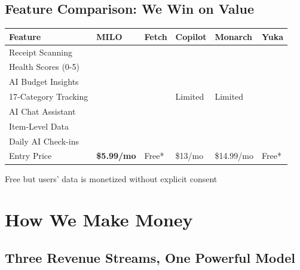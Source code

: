 \documentclass[11pt,a4paper]{report}
\newcommand{\cmark}{\textcolor{successgreen}{\ding{51}}}
\newcommand{\xmark}{\textcolor{dangerred}{\ding{55}}}
\begin{document}
\section{Feature Comparison: We Win on Value}

\begin{center}
\renewcommand{\arraystretch}{1.4}
\begin{tabular}{>{\raggedright\arraybackslash}p{3cm} >{\centering\arraybackslash}p{1.8cm} >{\centering\arraybackslash}p{1.8cm} >{\centering\arraybackslash}p{1.8cm} >{\centering\arraybackslash}p{1.8cm} >{\centering\arraybackslash}p{1.8cm}}
\toprule
\rowcolor{miloprimary!15}
\textbf{Feature} & \textbf{MILO} & \textbf{Fetch} & \textbf{Copilot} & \textbf{Monarch} & \textbf{Yuka} \\
\midrule
Receipt Scanning & \cmark & \cmark & \xmark & \xmark & \xmark \\
\rowcolor{lightbg}
Health Scores (0-5) & \cmark & \xmark & \xmark & \xmark & \cmark \\
AI Budget Insights & \cmark & \xmark & \cmark & \xmark & \xmark \\
\rowcolor{lightbg}
17-Category Tracking & \cmark & \xmark & Limited & Limited & \xmark \\
AI Chat Assistant & \cmark & \xmark & \cmark & \xmark & \xmark \\
\rowcolor{lightbg}
Item-Level Data & \cmark & \xmark & \xmark & \xmark & \cmark \\
Daily AI Check-ins & \cmark & \xmark & \xmark & \xmark & \xmark \\
\rowcolor{lightbg}
Entry Price & \textcolor{successgreen}{\textbf{\$5.99/mo}} & Free* & \$13/mo & \$14.99/mo & Free* \\
\bottomrule
\end{tabular}
\end{center}

{\small *Free but users' data is monetized without explicit consent}

\chapter{How We Make Money}

\section{Three Revenue Streams, One Powerful Model}
\end{document}
